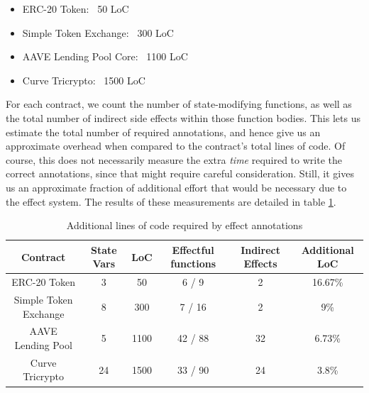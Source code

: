 \begin{itemize}
  \item ERC-20 Token: ~50 LoC
  \item Simple Token Exchange: ~300 LoC
  \item AAVE Lending Pool Core: ~1100 LoC
  \item Curve Tricrypto: ~1500 LoC
\end{itemize}

For each contract, we count the number of state-modifying functions, as well as the total number of indirect side effects within those function bodies. This lets us estimate the total number of required annotations, and hence give us an approximate overhead when compared to the contract's total lines of code. Of course, this does not necessarily measure the extra \textit{time} required to write the correct annotations, since that might require careful consideration. Still, it gives us an approximate fraction of additional effort that would be necessary due to the effect system. The results of these measurements are detailed in table \ref{table:effectlinesofcode}.

\begin{table}[h!]
\small
\centering
{\setlength{\extrarowheight}{5pt}
\begin{tabular}{  c  c  c  c  c  c }
 \toprule
 Contract                            & State Vars & LoC & Effectful functions & Indirect Effects & Additional LoC \\[4pt]
 \midrule
 ERC-20 Token                    & 3                & 50    & 6 / 9                         & 2                          &  \cellcolor{yellow!25}16.67\%      \\[3pt]
 Simple Token Exchange  & 8               & 300   & 7 / 16                       & 2                         & \cellcolor{yellow!25}9\%               \\[3pt]
 AAVE Lending Pool          & 5               & 1100 & 42 / 88                    & 32                        & \cellcolor{yellow!25}6.73\%          \\[3pt]
 Curve Tricrypto                 & 24             & 1500 & 33 / 90                    & 24                        &  \cellcolor{yellow!25}3.8\%           \\[3pt]
 \bottomrule
\end{tabular}
}
\caption{Additional lines of code required by effect annotations}
\label{table:effectlinesofcode}
\end{table}

